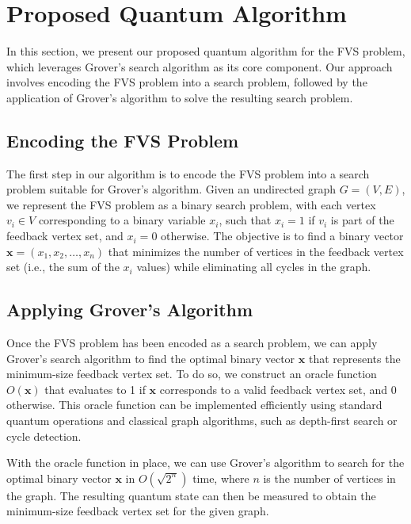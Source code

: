 \section{Proposed Quantum Algorithm}\label{sec:algorithm}

In this section, we present our proposed quantum algorithm for the FVS problem, which leverages Grover's search algorithm as its core component. Our approach involves encoding the FVS problem into a search problem, followed by the application of Grover's algorithm to solve the resulting search problem.

\subsection{Encoding the FVS Problem}

The first step in our algorithm is to encode the FVS problem into a search problem suitable for Grover's algorithm. Given an undirected graph $G=(V,E)$, we represent the FVS problem as a binary search problem, with each vertex $v_i \in V$ corresponding to a binary variable $x_i$, such that $x_i=1$ if $v_i$ is part of the feedback vertex set, and $x_i=0$ otherwise. The objective is to find a binary vector $\mathbf{x}=(x_1, x_2, \dots, x_n)$ that minimizes the number of vertices in the feedback vertex set (i.e., the sum of the $x_i$ values) while eliminating all cycles in the graph.

\subsection{Applying Grover's Algorithm}

Once the FVS problem has been encoded as a search problem, we can apply Grover's search algorithm to find the optimal binary vector $\mathbf{x}$ that represents the minimum-size feedback vertex set. To do so, we construct an oracle function $O(\mathbf{x})$ that evaluates to 1 if $\mathbf{x}$ corresponds to a valid feedback vertex set, and 0 otherwise. This oracle function can be implemented efficiently using standard quantum operations and classical graph algorithms, such as depth-first search or cycle detection.

With the oracle function in place, we can use Grover's algorithm to search for the optimal binary vector $\mathbf{x}$ in $O(\sqrt{2^n})$ time, where $n$ is the number of vertices in the graph. The resulting quantum state can then be measured to obtain the minimum-size feedback vertex set for the given graph.

